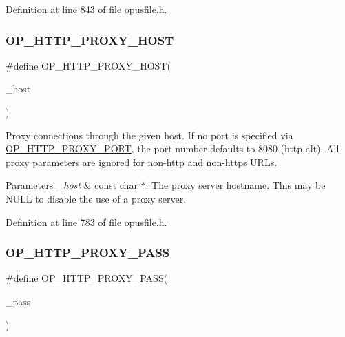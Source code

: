 Definition at line 843 of file opusfile.\+h.

\mbox{\label{group__url__options_gab3b517acdb74c0d0b51800af86a58876}} 
\subsubsection{\texorpdfstring{OP\_HTTP\_PROXY\_HOST}{OP\_HTTP\_PROXY\_HOST}}
{\footnotesize\ttfamily \#define O\+P\+\_\+\+H\+T\+T\+P\+\_\+\+P\+R\+O\+X\+Y\+\_\+\+H\+O\+ST(\begin{DoxyParamCaption}\item[{}]{\+\_\+host }\end{DoxyParamCaption})}

Proxy connections through the given host. If no port is specified via \mbox{\hyperlink{group__url__options_ga838d23878f4135691684203baa75ed0c}{O\+P\+\_\+\+H\+T\+T\+P\+\_\+\+P\+R\+O\+X\+Y\+\_\+\+P\+O\+RT}}, the port number defaults to 8080 (http-\/alt). All proxy parameters are ignored for non-\/http and non-\/https U\+R\+Ls. 
\begin{DoxyParams}{Parameters}
{\em \+\_\+host} & {\ttfamily const char $\ast$}\+: The proxy server hostname. This may be {\ttfamily N\+U\+LL} to disable the use of a proxy server. \\
\hline
\end{DoxyParams}


Definition at line 783 of file opusfile.\+h.

\mbox{\label{group__url__options_gaad96c33557407e406cca89477b2e7892}} 
\subsubsection{\texorpdfstring{OP\_HTTP\_PROXY\_PASS}{OP\_HTTP\_PROXY\_PASS}}
{\footnotesize\ttfamily \#define O\+P\+\_\+\+H\+T\+T\+P\+\_\+\+P\+R\+O\+X\+Y\+\_\+\+P\+A\+SS(\begin{DoxyParamCaption}\item[{}]{\+\_\+pass }\end{DoxyParamCaption})}

